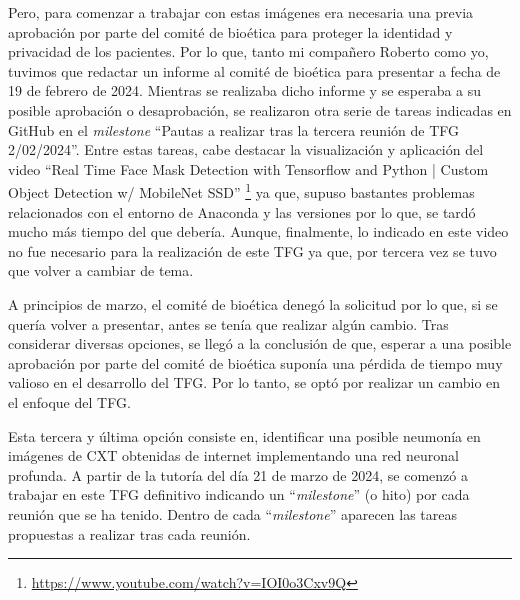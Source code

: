Pero, para comenzar a trabajar con estas imágenes era necesaria una previa aprobación por parte del comité de bioética para proteger la identidad y privacidad de los pacientes. Por lo que, tanto mi compañero Roberto como yo, tuvimos que redactar un informe al comité de bioética para presentar a fecha de 19 de febrero de 2024. Mientras se realizaba dicho informe y se esperaba a su posible aprobación o desaprobación, se realizaron otra serie de tareas indicadas en GitHub en el \textit{milestone} ``Pautas a realizar tras la tercera reunión de TFG 2/02/2024''. Entre estas tareas, cabe destacar la visualización y aplicación del video ``Real Time Face Mask Detection with Tensorflow and Python | Custom Object Detection w/ MobileNet SSD'' \footnote{\url{https://www.youtube.com/watch?v=IOI0o3Cxv9Q}} ya que, supuso bastantes problemas relacionados con el entorno de Anaconda y las versiones por lo que, se tardó mucho más tiempo del que debería. Aunque, finalmente, lo indicado en este video no fue necesario para la realización de este TFG ya que, por tercera vez se tuvo que volver a cambiar de tema.

A principios de marzo, el comité de bioética denegó la solicitud por lo que, si se quería volver a presentar, antes se tenía que realizar algún cambio. Tras considerar diversas opciones, se llegó a la conclusión de que, esperar a una posible aprobación por parte del comité de bioética suponía una pérdida de tiempo muy valioso en el desarrollo del TFG. Por lo tanto, se optó por realizar un cambio en el enfoque del TFG. 

Esta tercera y última opción consiste en, identificar una posible neumonía en imágenes de CXT obtenidas de internet implementando una red neuronal profunda. A partir de la tutoría del día 21 de marzo de 2024, se comenzó a trabajar en este TFG definitivo indicando un ``\textit{milestone}'' (o hito) por cada reunión que se ha tenido. Dentro de cada ``\textit{milestone}'' aparecen las tareas propuestas a realizar tras cada reunión.

